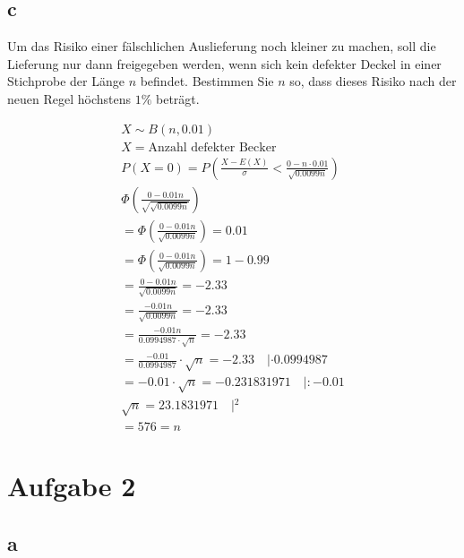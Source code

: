 \subsection{c}

Um das Risiko einer fälschlichen Auslieferung noch kleiner zu machen, soll die
Lieferung nur dann freigegeben werden, wenn sich kein defekter Deckel in einer
Stichprobe der Länge $n$ befindet. Bestimmen Sie $n$ so, dass dieses Risiko
nach der neuen Regel höchstens $1\%$ beträgt.

\begin{align*}
    X \sim B(n, 0.01)                                                                          \\
    X = \text{Anzahl defekter Becker}                                                          \\
    P(X = 0) = P\left(\frac{X - E(X)}{\sigma} < \frac{0 - n \cdot 0.01}{\sqrt{0.0099n}}\right) \\
    \Phi\left(\frac{0 - 0.01n}{\sqrt{\sqrt{0.0099n}}}\right)                                   \\
    = \Phi\left(\frac{0 - 0.01n}{\sqrt{0.0099n}}\right) = 0.01                                 \\
    = \Phi\left(\frac{0 - 0.01n}{\sqrt{0.0099n}}\right) = 1 - 0.99                             \\
    = \frac{0 - 0.01n}{\sqrt{0.0099n}} = -2.33                                                 \\
    = \frac{-0.01n}{\sqrt{0.0099n}} = -2.33                                                    \\
    = \frac{-0.01n}{0.0994987 \cdot \sqrt{n}} = -2.33                                          \\
    = \frac{-0.01}{0.0994987} \cdot \sqrt{n} = -2.33  \quad | \cdot 0.0994987                  \\
    = -0.01 \cdot \sqrt{n} = -0.231831971 \quad | : -0.01                                      \\
    \sqrt{n} = 23.1831971 \quad | \phantom{}^2                                                 \\
    = 576 = n
\end{align*}

\section{Aufgabe 2}

\subsection{a}

